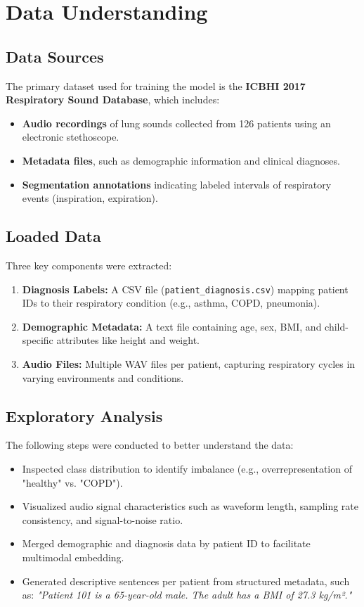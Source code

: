 \section{Data Understanding}

\subsection{Data Sources}
The primary dataset used for training the model is the \textbf{ICBHI 2017 Respiratory Sound Database}, which includes:
\begin{itemize}
    \item \textbf{Audio recordings} of lung sounds collected from 126 patients using an electronic stethoscope.
    \item \textbf{Metadata files}, such as demographic information and clinical diagnoses.
    \item \textbf{Segmentation annotations} indicating labeled intervals of respiratory events (inspiration, expiration).
\end{itemize}

\subsection{Loaded Data}
Three key components were extracted:
\begin{enumerate}
    \item \textbf{Diagnosis Labels:} A CSV file (\texttt{patient\_diagnosis.csv}) mapping patient IDs to their respiratory condition (e.g., asthma, COPD, pneumonia).
    \item \textbf{Demographic Metadata:} A text file containing age, sex, BMI, and child-specific attributes like height and weight.
    \item \textbf{Audio Files:} Multiple WAV files per patient, capturing respiratory cycles in varying environments and conditions.
\end{enumerate}

\subsection{Exploratory Analysis}
The following steps were conducted to better understand the data:
\begin{itemize}
    \item Inspected class distribution to identify imbalance (e.g., overrepresentation of "healthy" vs. "COPD").
    \item Visualized audio signal characteristics such as waveform length, sampling rate consistency, and signal-to-noise ratio.
    \item Merged demographic and diagnosis data by patient ID to facilitate multimodal embedding.
    \item Generated descriptive sentences per patient from structured metadata, such as:
    \textit{"Patient 101 is a 65-year-old male. The adult has a BMI of 27.3 kg/m²."}
\end{itemize}

